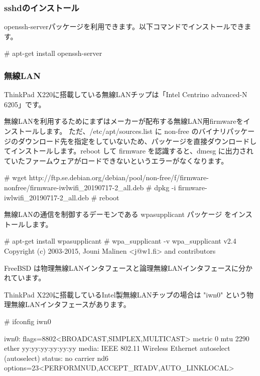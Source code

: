 \documentclass[mingoth,a4paper]{jsarticle}
\begin{document}
\subsubsection{sshdのインストール}

openssh-serverパッケージを利用できます。以下コマンドでインストールできます。

\begin{commandline}
# apt-get install openssh-server
\end{commandline}


\subsubsection{無線LAN}


ThinkPad X220に搭載している無線LANチップは「Intel Centrino advanced-N 6205」です。

無線LANを利用するためにまずはメーカーが配布する無線LAN用firmwareをインストールします。
ただ、/etc/apt/sources.list に non-free のバイナリパッケージのダウンロード先を指定をしていないため、パッケージを直接ダウンロードしてインストールします。reboot して firmware を認識すると、dmesg に出力されていたファームウェアがロードできないというエラーがなくなります。

\begin{commandline}
# wget http://ftp.se.debian.org/debian/pool/non-free/f/firmware-nonfree/firmware-iwlwifi_20190717-2_all.deb
# dpkg -i firmware-iwlwifi_20190717-2_all.deb
# reboot
\end{commandline}

無線LANの通信を制御するデーモンである wpasupplicant パッケージ をインストールします。

\begin{commandline}
# apt-get install wpasupplicant
# wpa_supplicant -v
wpa_supplicant v2.4
Copyright (c) 2003-2015, Jouni Malinen <j@w1.fi> and contributors
\end{commandline}



FreeBSD は物理無線LANインタフェースと論理無線LANインタフェースに分かれています。

ThinkPad X220に搭載しているIntel製無線LANチップの場合は "iwn0" という物理無線LANインタフェースがあります。

\begin{commandline}
# ifconfig iwn0

iwn0: flags=8802<BROADCAST,SIMPLEX,MULTICAST> metric 0 mtu 2290
        ether yy:yy:yy:yy:yy:yy
        media: IEEE 802.11 Wireless Ethernet autoselect (autoselect)
        status: no carrier
        nd6 options=23<PERFORMNUD,ACCEPT_RTADV,AUTO_LINKLOCAL>
\end{commandline}
\end{document}
